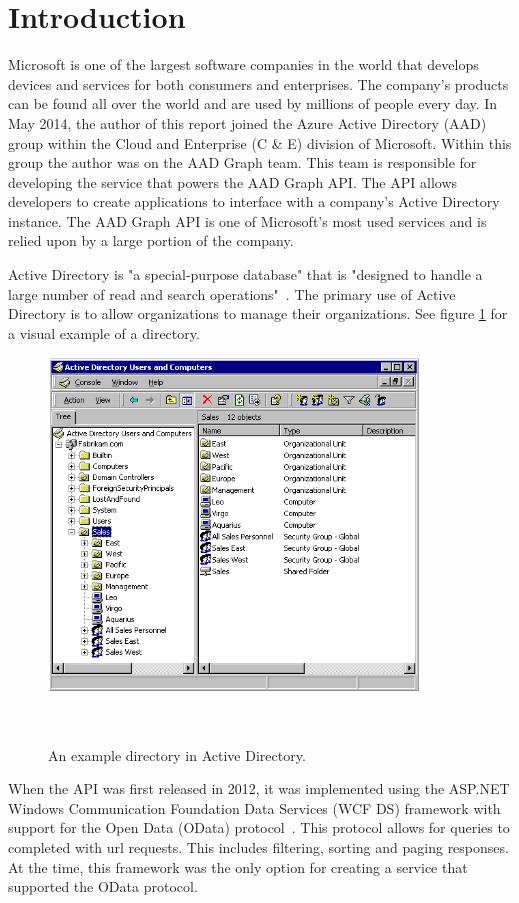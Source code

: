 \documentclass[se]{uw-wkrpt}
\begin{document}
\section{Introduction}\label{sec:intro}

Microsoft is one of the largest software companies in the world that develops devices and services for both consumers and enterprises. The company's products can be found all over the world and are used by millions of people every day. In May 2014, the author of this report joined the Azure Active Directory (AAD) group within the Cloud and Enterprise (C \& E) division of Microsoft. Within this group the author was on the AAD Graph team. This team is responsible for developing the service that powers the AAD Graph API. The API allows developers to create applications to interface with a company's Active Directory instance. The AAD Graph API is one of Microsoft's most used services and is relied upon by a large portion of the company.

Active Directory is "a special-purpose database" that is "designed to handle a large number of read and search operations"~\cite{ref:ad}. The primary use of Active Directory is to allow organizations to manage their organizations. See figure \ref{fig:ad} for a visual example of a directory.

\begin{figure}
  \centering
  \includegraphics[height=3.5in]{ad}
  \caption[An example directory in Active Directory.]{An example directory in Active Directory.}~\cite{ref:ad}
  \label{fig:ad}
\end{figure}


When the API was first released in 2012, it was implemented using the ASP.NET Windows Communication Foundation Data Services (WCF DS) framework with support for the Open Data (OData) protocol~\cite{ref:graph}. This protocol allows for queries to completed with url requests. This includes filtering, sorting and paging responses. At the time, this framework was the only option for creating a service that supported the OData protocol.
\end{document}
